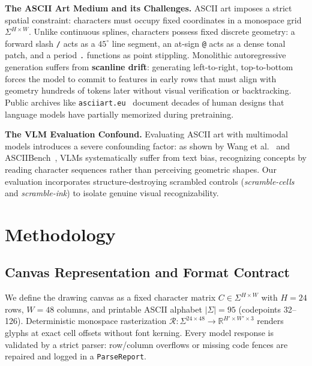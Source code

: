 \documentclass[10pt,twocolumn]{article}
\begin{document}
\textbf{The ASCII Art Medium and its Challenges.}
ASCII art imposes a strict spatial constraint: characters must occupy fixed coordinates in a monospace grid $\Sigma^{H \times W}$. Unlike continuous splines, characters possess fixed discrete geometry: a forward slash \texttt{/} acts as a $45^\circ$ line segment, an at-sign \texttt{@} acts as a dense tonal patch, and a period \texttt{.} functions as point stippling. Monolithic autoregressive generation suffers from \textbf{scanline drift}: generating left-to-right, top-to-bottom forces the model to commit to features in early rows that must align with geometry hundreds of tokens later without visual verification or backtracking. Public archives like \texttt{asciiart.eu}~\cite{asciiart_archive} document decades of human designs that language models have partially memorized during pretraining.

\textbf{The VLM Evaluation Confound.}
Evaluating ASCII art with multimodal models introduces a severe confounding factor: as shown by Wang et al.~\cite{wang2025textspeaks} and ASCIIBench~\cite{luo2025asciibench}, VLMs systematically suffer from text bias, recognizing concepts by reading character sequences rather than perceiving geometric shapes. Our evaluation incorporates structure-destroying scrambled controls (\emph{scramble-cells} and \emph{scramble-ink}) to isolate genuine visual recognizability.

\section{Methodology}

\subsection{Canvas Representation and Format Contract}
We define the drawing canvas as a fixed character matrix $C \in \Sigma^{H \times W}$ with $H=24$ rows, $W=48$ columns, and printable ASCII alphabet $|\Sigma|=95$ (codepoints 32--126). Deterministic monospace rasterization $\mathcal{R}: \Sigma^{24 \times 48} \to \mathbb{R}^{H' \times W' \times 3}$ renders glyphs at exact cell offsets without font kerning. Every model response is validated by a strict parser: row/column overflows or missing code fences are repaired and logged in a \texttt{ParseReport}.
\end{document}
